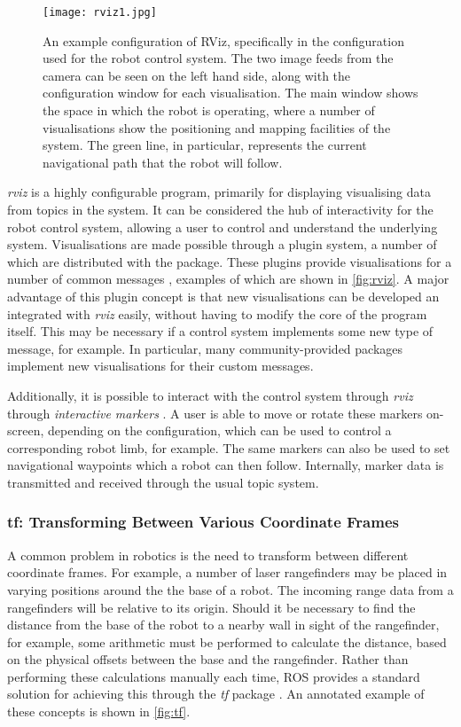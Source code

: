 \begin{figure}[!h]
    \centering
    \texttt{[image: rviz1.jpg]}
    \caption{An example configuration of RViz, specifically in the configuration used for the robot control system. The two image feeds from the camera can be seen on the left hand side, along with the configuration window for each visualisation. The main window shows the space in which the robot is operating, where a number of visualisations show the positioning and mapping facilities of the system. The green line, in particular, represents the current navigational path that the robot will follow.}
    \label{fig:rviz}
\end{figure}

\emph{rviz} is a highly configurable program, primarily for displaying visualising data from topics in the system. It can be considered the hub of interactivity for the robot control system, allowing a user to control and understand the underlying system. Visualisations are made possible through a plugin system, a number of which are distributed with the package. These plugins provide visualisations for a number of common messages \cite{ros_wiki_rviz_datatypes}, examples of which are shown in \autoref{fig:rviz}. A major advantage of this plugin concept is that new visualisations can be developed an integrated with \emph{rviz} easily, without having to modify the core of the program itself. This may be necessary if a control system implements some new type of message, for example. In particular, many community-provided packages implement new visualisations for their custom messages.

Additionally, it is possible to interact with the control system through \emph{rviz} through \emph{interactive markers} \cite{ros_wiki_rviz_intmark}. A user is able to move or rotate these markers on-screen, depending on the configuration, which can be used to control a corresponding robot limb, for example. The same markers can also be used to set navigational waypoints which a robot can then follow. Internally, marker data is transmitted and received through the usual topic system.

\subsubsection{tf: Transforming Between Various Coordinate Frames}
A common problem in robotics is the need to transform between different coordinate frames. For example, a number of laser rangefinders may be placed in varying positions around the the base of a robot. The incoming range data from a rangefinders will be relative to its origin. Should it be necessary to find the distance from the base of the robot to a nearby wall in sight of the rangefinder, for example, some arithmetic must be performed to calculate the distance, based on the physical offsets between the base and the rangefinder. Rather than performing these calculations manually each time, ROS provides a standard solution for achieving this through the \emph{tf} package \cite{ros_wiki_tf}. An annotated example of these concepts is shown in \autoref{fig:tf}.

